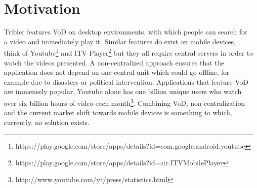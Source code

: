 \section{Motivation}
\label{sec:motivation}
Tribler features VoD on desktop environments, with which people can search for a video and immediately play it. Similar features do exist on mobile devices, think of Youtube\footnote{https://play.google.com/store/apps/details?id=com.google.android.youtube} and ITV Player\footnote{https://play.google.com/store/apps/details?id=air.ITVMobilePlayer} but they all require central servers in order to watch the videos presented. A non-centralized approach ensures that the application does not depend on one central unit which could go offline, for example due to disasters or political intervention. Applications that feature VoD are immensely popular, Youtube alone has one billion unique users who watch over six billion hours of video each month\footnote{http://www.youtube.com/yt/press/statistics.html}. Combining VoD, non-centralization and the current market shift towards mobile devices is something to which, currently, no solution exists.
